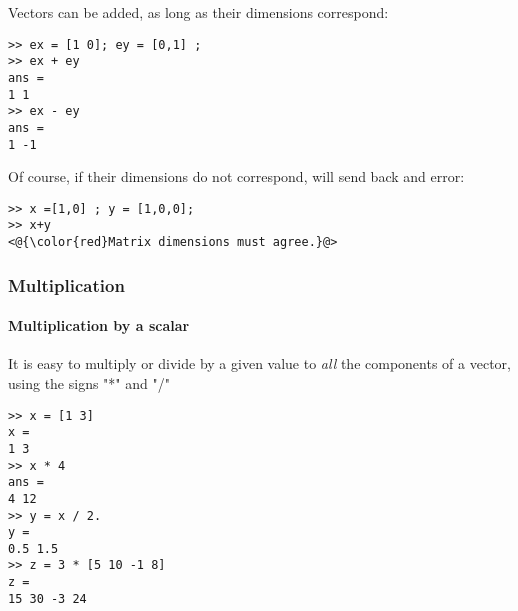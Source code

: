 Vectors can be added, as long as their dimensions correspond:

\begin{lstlisting}
>> ex = [1 0]; ey = [0,1] ;
>> ex + ey
ans =
1 1
>> ex - ey
ans =
1 -1
\end{lstlisting}

Of course, if their dimensions do not correspond, \matlab will send back and error:

\begin{lstlisting}
>> x =[1,0] ; y = [1,0,0];
>> x+y
<@{\color{red}Matrix dimensions must agree.}@>
\end{lstlisting}







\subsubsection{Multiplication}
\paragraph{Multiplication by a scalar}

It is easy to multiply or divide by a given value to \emph{all} the components of a vector, using the signs "*" and "/"

\begin{lstlisting}
>> x = [1 3]
x = 
1 3
>> x * 4
ans =
4 12
>> y = x / 2.
y =
0.5 1.5
>> z = 3 * [5 10 -1 8]
z = 
15 30 -3 24
\end{lstlisting}



